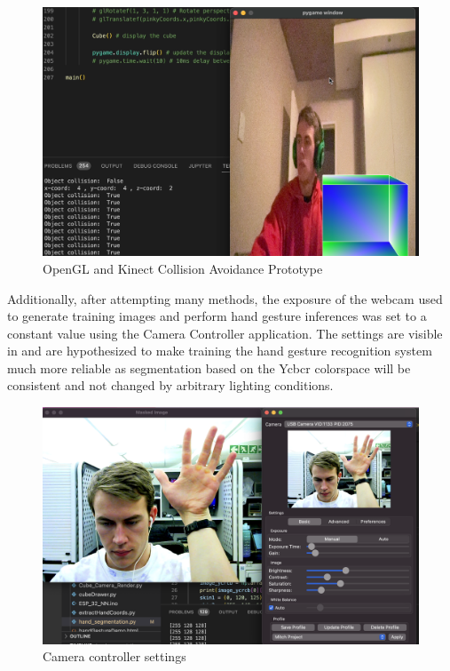 \begin{figure}[h]
    \centering
    \includegraphics[width=0.9\linewidth]{figures/OpenGL_Kinect_collision_avoidance.png}
    \caption{OpenGL and Kinect Collision Avoidance Prototype}
    \label{fig:OpenGL_Kinect_collision_avoidance}
\end{figure}

Additionally, after attempting many methods, the exposure of the webcam used to generate training images and perform hand gesture inferences was set to a constant value using the Camera Controller application. The settings are visible in  and are hypothesized to make training the hand gesture recognition system much more reliable as segmentation based on the Ycbcr colorspace will be consistent and not changed by arbitrary lighting conditions.

\begin{figure}[h]
    \centering
    \includegraphics[width=0.9\linewidth]{figures/camera_controller_exposure_settings.png}
    \caption{Camera controller settings}
    \label{fig:camera_controller_exposure_settings}
\end{figure}


